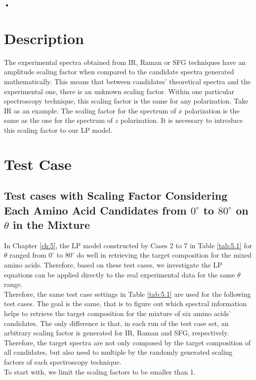 \textbf{•} \label{ch:6}
\section{Description}
The experimental spectra obtained from IR, Raman or SFG techniques have an amplitude scaling factor when compared to the candidate spectra generated mathematically. This means that between candidates' theoretical spectra and the experimental one, there is an unknown scaling factor. Within one particular spectroscopy technique, this scaling factor is the same for any polarization. Take IR as an example. The scaling factor for the spectrum of $x$ polarization is the same as the one for the spectrum of $z$ polarization. It is necessary to introduce this scaling factor to our LP model. \\

\section{Test Case}
\subsection{Test cases with Scaling Factor Considering Each Amino Acid Candidates from $0^{\circ}$ to $80^{\circ}$ on $\theta$ in the Mixture}
In Chapter \ref{ch:5}, the LP model constructed by Cases 2 to 7 in Table \ref{tab:5.1} for $\theta$ ranged from $0^{\circ}$ to $80^{\circ}$ do well in retrieving the target composition for the mixed amino acids. Therefore, based on these test cases, we investigate the LP equations can be applied directly to the real experimental data for the same $\theta$ range.\\

Therefore, the same test case settings in Table \ref{tab:5.1} are used for the following test cases. The goal is the same, that is to figure out which spectral information helps to retrieve the target composition for the mixture of six amino acids' candidates. The only difference is that, in each run of the test case set, an arbitrary scaling factor is generated for IR, Raman and SFG, respectively. Therefore, the target spectra are not only composed by the target composition of all candidates, but also need to multiple by the randomly generated scaling factors of each spectroscopy technique. \\

To start with, we limit the scaling factors to be smaller than 1. \\

